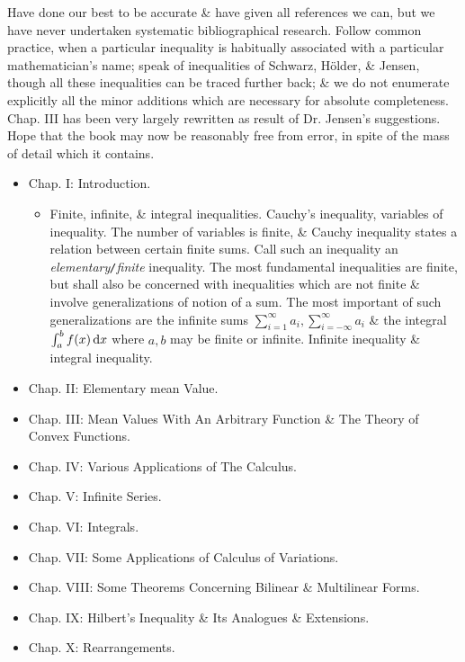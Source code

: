 \documentclass{article}
\begin{document}
\begin{enumerate}
	Have done our best to be accurate \& have given all references we can, but we have never undertaken systematic bibliographical research. Follow common practice, when a particular inequality is habitually associated with a particular mathematician's name; speak of inequalities of {\sc Schwarz, H\"older, \& Jensen}, though all these inequalities can be traced further back; \& we do not enumerate explicitly all the minor additions which are necessary for absolute completeness. Chap. III has been very largely rewritten as result of Dr. {\sc Jensen}'s suggestions. Hope that the book may now be reasonably free from error, in spite of the mass of detail which it contains.
	\begin{itemize}
		\item {\sf Chap. I: Introduction.}
		\begin{itemize}
			\item {\sf Finite, infinite, \& integral inequalities.} Cauchy's inequality, variables of inequality. The number of variables is finite, \& Cauchy inequality states a relation between certain finite sums. Call such an inequality an {\it elementary{\tt/}finite} inequality. The most fundamental inequalities are finite, but shall also be concerned with inequalities which are not finite \& involve generalizations of notion of a sum. The most important of such generalizations are the infinite sums $\sum_{i=1}^\infty a_i,\sum_{i=-\infty}^\infty a_i$ \& the integral $\int_a^b f(x)\,{\rm d}x$ where $a,b$ may be finite or infinite. Infinite inequality \& integral inequality.
		\end{itemize}
		\item {\sf Chap. II: Elementary mean Value.}
		\item {\sf Chap. III: Mean Values With An Arbitrary Function \& The Theory of Convex Functions.}
		\item {\sf Chap. IV: Various Applications of The Calculus.}
		\item {\sf Chap. V: Infinite Series.}
		\item {\sf Chap. VI: Integrals.}
		\item {\sf Chap. VII: Some Applications of Calculus of Variations.}
		\item {\sf Chap. VIII: Some Theorems Concerning Bilinear \& Multilinear Forms.}
		\item {\sf Chap. IX: Hilbert's Inequality \& Its Analogues \& Extensions.}
		\item {\sf Chap. X: Rearrangements.}
	\end{itemize}


\end{enumerate}
\end{document}
